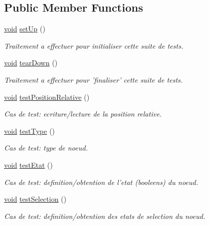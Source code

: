 \subsection*{Public Member Functions}
\begin{DoxyCompactItemize}
\item 
\hyperlink{wglew_8h_aeea6e3dfae3acf232096f57d2d57f084}{void} \hyperlink{group__inf2990_ga4d2fe388f550ba374823d09b5c8ebe77}{set\-Up} ()
\begin{DoxyCompactList}\small\item\em Traitement a effectuer pour initialiser cette suite de tests. \end{DoxyCompactList}\item 
\hyperlink{wglew_8h_aeea6e3dfae3acf232096f57d2d57f084}{void} \hyperlink{group__inf2990_ga2c5c558ff7e40386c724a55b670af417}{tear\-Down} ()
\begin{DoxyCompactList}\small\item\em Traitement a effectuer pour 'finaliser' cette suite de tests. \end{DoxyCompactList}\item 
\hyperlink{wglew_8h_aeea6e3dfae3acf232096f57d2d57f084}{void} \hyperlink{group__inf2990_gaed7a5423d2a3a7518aef743f17d32ccd}{test\-Position\-Relative} ()
\begin{DoxyCompactList}\small\item\em Cas de test\-: ecriture/lecture de la position relative. \end{DoxyCompactList}\item 
\hyperlink{wglew_8h_aeea6e3dfae3acf232096f57d2d57f084}{void} \hyperlink{group__inf2990_gadf554a62266cc21c7c48f6a27ad7c752}{test\-Type} ()
\begin{DoxyCompactList}\small\item\em Cas de test\-: type de noeud. \end{DoxyCompactList}\item 
\hyperlink{wglew_8h_aeea6e3dfae3acf232096f57d2d57f084}{void} \hyperlink{group__inf2990_ga3def02e7ab244d09d1ffc231c47818b2}{test\-Etat} ()
\begin{DoxyCompactList}\small\item\em Cas de test\-: definition/obtention de l'etat (booleens) du noeud. \end{DoxyCompactList}\item 
\hyperlink{wglew_8h_aeea6e3dfae3acf232096f57d2d57f084}{void} \hyperlink{group__inf2990_gac044744b04574c86418a57b39e3238ff}{test\-Selection} ()
\begin{DoxyCompactList}\small\item\em Cas de test\-: definition/obtention des etats de selection du noeud. \end{DoxyCompactList}\item 

\end{DoxyCompactItemize}
